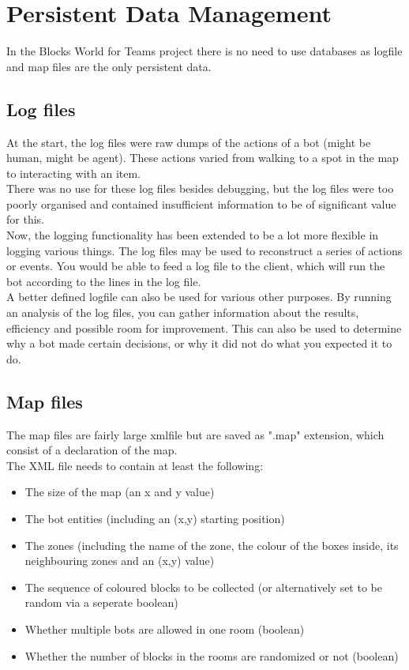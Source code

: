 \section{Persistent Data Management}
In the Blocks World for Teams project there is no need to use databases as \gls{logfile} and map files are the only persistent data.
\subsection{Log files}
At the start, the log files were raw dumps of the actions of a bot (might be human, might be agent). These actions varied from walking to a spot in the map to interacting with an item. \\
There was no use for these log files besides \gls{debugging}, but the log files were too poorly organised and contained insufficient information to be of significant value for this. \\
Now, the logging functionality has been extended to be a lot more flexible in logging various things. The log files may be used to reconstruct a series of actions or events. You would be able to feed a log file to the client, which will run the bot according to the lines in the log file. \\
A better defined logfile can also be used for various other purposes. By running an analysis of the log files, you can gather information about the results, efficiency and possible room for improvement. This can also be used to determine why a bot made certain decisions, or why it did not do what you expected it to do. 

\subsection{Map files}
The map files are fairly large \gls{xmlfile} but are saved as ".map" extension, which consist of a declaration of the map. \\
The XML file needs to contain at least the following:
\begin{itemize}
\item The size of the map (an x and y value)
\item The bot entities (including an (x,y) starting position)
\item The zones (including the name of the zone, the colour of the boxes inside, its neighbouring zones and an (x,y) value)
\item The sequence of coloured blocks to be collected (or alternatively set to be random via a seperate boolean)
\item Whether multiple bots are allowed in one room (boolean)
\item Whether the number of blocks in the rooms are randomized or not (boolean)
\end{itemize}


